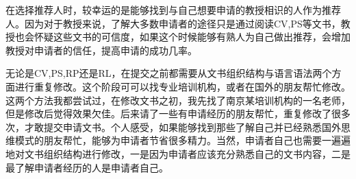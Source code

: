 在选择推荐人时，较幸运的是能够找到与自己想要申请的教授相识的人作为推荐人。因为对于教授来说，了解大多数申请者的途径只是通过阅读CV,PS等文书，教授也会怀疑这些文书的可信度，如果这个时候能够有熟人为自己做出推荐，会增加教授对申请者的信任，提高申请的成功几率。\par

无论是CV,PS,RP还是RL，在提交之前都需要从文书组织结构与语言语法两个方面进行重复修改。这个阶段可可以找专业培训机构，或者在国外的朋友帮忙修改。这两个方法我都尝试过，在修改文书之初，我先找了南京某培训机构的一名老师，但是修改后觉得效果欠佳。后来请了一些有申请经历的朋友帮忙，重复修改了很多次，才敢提交申请文书。个人感受，如果能够找到那些了解自己并已经熟悉国外思维模式的朋友帮忙，能够为申请者节省很多精力。当然，申请者自己也需要一遍遍地对文书组织结构进行修改，一是因为申请者应该充分熟悉自己的文书内容，二是最了解申请者经历的人是申请者自己。
